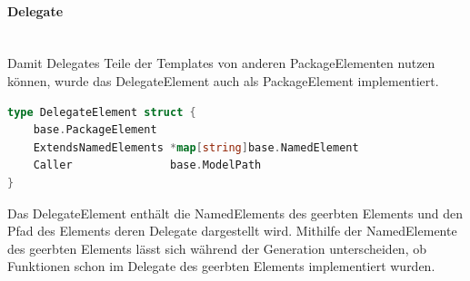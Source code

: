 \documentclass[./einleitung.tex]{subfiles}
\begin{document}
    \paragraph{Delegate}\mbox{}\\
    Damit Delegates Teile der Templates von anderen PackageElementen nutzen können, wurde das DelegateElement auch als PackageElement implementiert.
    \begin{lstlisting}[language=Go, caption=Definition des DelegateElements, label=lst:DelegateElement]
type DelegateElement struct {
	base.PackageElement
	ExtendsNamedElements *map[string]base.NamedElement
	Caller               base.ModelPath
}
    \end{lstlisting}
    Das DelegateElement enthält die NamedElements des geerbten Elements und den Pfad des Elements deren Delegate dargestellt wird.
    Mithilfe der NamedElemente des geerbten Elements lässt sich während der Generation unterscheiden, ob Funktionen schon im Delegate des geerbten Elements implementiert wurden.
\end{document}
